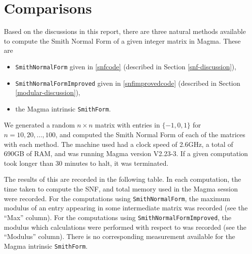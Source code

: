 \documentclass[12pt,a4paper]{article}
\theoremstyle{definition}
\begin{document}
\section{Comparisons}

Based on the discussions in this report, there are three natural methods available to compute the Smith Normal Form of a given integer matrix in {\sc Magma}. These are
\begin{itemize}
\item \texttt{SmithNormalForm} given in \autoref{snfcode} (described in Section \ref{snf-discussion}), \item \texttt{SmithNormalFormImproved} given in \autoref{snfimprovedcode} (described in Section \ref{modular-discussion}),
\item the {\sc Magma} intrinsic \texttt{SmithForm}.
\end{itemize}

We generated a random $n\times n$ matrix with entries in $\{-1,0,1\}$ for $n=10,20,\ldots,100$, and computed the Smith Normal Form of each of the matrices with each method. The machine used had a clock speed of 2.6GHz, a total of 690GB of RAM, and was running {\sc Magma} version V2.23-3. If a given computation took longer than 30 minutes to halt, it was terminated.

The results of this are recorded in the following table. In each computation, the time taken to compute the SNF, and total memory used in the {\sc Magma} session were recorded. For the computations using \texttt{SmithNormalForm}, the maximum modulus of an entry appearing in some intermediate matrix was recorded (see the ``Max'' column). For the computations using \texttt{SmithNormalFormImproved}, the modulus which calculations were performed with respect to was recorded (see the ``Modulus'' column). There is no corresponding measurement available for the {\sc Magma} intrinsic \texttt{SmithForm}.
\end{document}
